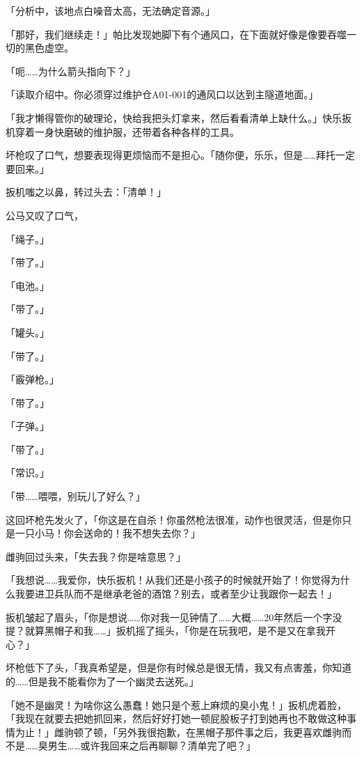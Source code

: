 「{\mtzh 分析中，该地点白噪音太高，无法确定音源。}」

「那好，我们继续走！」帕比发现她脚下有个通风口，在下面就好像是像要吞噬一切的黑色虚空。

「呃……为什么箭头指向下？」

「{\mtzh 读取介绍中。你必须穿过维护仓A01-001的通风口以达到主隧道地面。}」

\horizonline


「我才懒得管你的破理论，快给我把头灯拿来，然后看看清单上缺什么。」快乐扳机穿着一身快磨破的维护服，还带着各种各样的工具。

坏枪叹了口气，想要表现得更烦恼而不是担心。「随你便，乐乐，但是……拜托一定要回来。」

扳机嗤之以鼻，转过头去：「清单！」

公马又叹了口气，

「绳子。」

「带了。」

「电池。」

「带了。」

「罐头。」

「带了。」

「霰弹枪。」

「带了。」

「子弹。」

「带了。」

「常识。」

「带……喂喂，别玩儿了好么？」

这回坏枪先发火了，「你这是在自杀！你虽然枪法很准，动作也很灵活，但是你只是一只小马！你会送命的！我不想失去你？」

雌驹回过头来，「失去我？你是啥意思？」

「我想说……我爱你，快乐扳机！从我们还是小孩子的时候就开始了！你觉得为什么我要进卫兵队而不是继承老爸的酒馆？别去，或者至少让我跟你一起去！」

扳机皱起了眉头，「你是想说……你对我一见钟情了……大概……20年然后一个字没提？就算黑帽子和我……」扳机摇了摇头，「你是在玩我吧，是不是又在拿我开心？」

坏枪低下了头，「我真希望是，但是你有时候总是很无情，我又有点害羞，你知道的……但是我不能看你为了一个幽灵去送死。」

「她不是幽灵！为啥你这么愚蠢！她只是个惹上麻烦的臭小鬼！」扳机虎着脸，「我现在就要去把她抓回来，然后好好打她一顿屁股板子打到她再也不敢做这种事情为止！」雌驹顿了顿，「另外我很抱歉，在黑帽子那件事之后，我更喜欢雌驹而不是……臭男生……或许我回来之后再聊聊？清单完了吧？」

